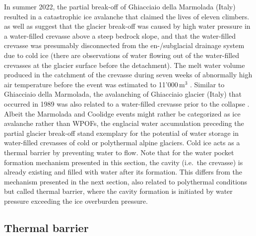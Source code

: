 In summer 2022, the partial break-off of Ghiacciaio della Marmolada (Italy) resulted in a catastrophic ice avalanche that claimed the lives of eleven climbers. \cite{Bondesan&Roberto2023} as well as \cite{Chiarle&al2023} suggest that the glacier break-off was caused by high water pressure in a water-filled crevasse above a steep bedrock slope, and that the water-filled crevasse was presumably disconnected from the en-/subglacial drainage system due to cold ice (there are observations of water flowing out of the water-filled crevasses at the glacier surface before the detachment). The melt water volume produced in the catchment of the crevasse during seven weeks of abnormally high air temperature before the event was estimated to 11'000\,m$^3$ \citep{Bondesan&Roberto2023}. Similar to Ghiacciaio della Marmolada, the avalanching of Ghiacciaio glacier (Italy) that occurred in 1989 was also related to a water-filled crevasse prior to the collapse \citep{Dutto&al1991,Chiarle&al2023}. Albeit the Marmolada and Coolidge events might rather be categorized as ice avalanche rather than WPOFs, the englacial water accumulation preceding the partial glacier break-off stand exemplary for the potential of water storage in water-filled crevasses of cold or polythermal alpine glaciers. Cold ice acts as a thermal barrier by preventing water to flow. Note that for the water pocket formation mechanism presented in this section, the cavity (i.e.\ the crevasse) is already existing and filled with water after its formation. This differs from the mechanism presented in the next section, also related to polythermal conditions but called thermal barrier, where the cavity formation is initiated by water pressure exceeding the ice overburden pressure. 


\subsection{ Thermal barrier}
\label{sec:thermal_barrier}

